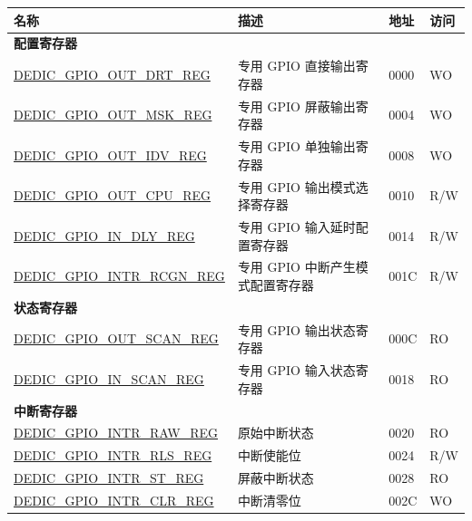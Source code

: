 \begin{longtable}{ | p{6cm} | p{7.2cm} | p{1.3cm} | p{1cm} | }
\hline\rowcolor{lightgray}
名称 & 描述 &  地址 & 访问 \\ \hline
\endhead
\multicolumn{4}{|l|}{\textbf{配置寄存器}} \\ \hline
\hyperref[regdesc:DEDICGPIOOUTDRTREG]{DEDIC\_GPIO\_OUT\_DRT\_REG} & 专用 GPIO 直接输出寄存器 & \hexprefix{}0000 & WO \\ \hline
\hyperref[regdesc:DEDICGPIOOUTMSKREG]{DEDIC\_GPIO\_OUT\_MSK\_REG} & 专用 GPIO 屏蔽输出寄存器 & \hexprefix{}0004 & WO \\ \hline
\hyperref[regdesc:DEDICGPIOOUTIDVREG]{DEDIC\_GPIO\_OUT\_IDV\_REG} & 专用 GPIO 单独输出寄存器 & \hexprefix{}0008 & WO \\ \hline
\hyperref[regdesc:DEDICGPIOOUTCPUREG]{DEDIC\_GPIO\_OUT\_CPU\_REG} & 专用 GPIO 输出模式选择寄存器 & \hexprefix{}0010 & R/W \\ \hline
\hyperref[regdesc:DEDICGPIOINDLYREG]{DEDIC\_GPIO\_IN\_DLY\_REG} & 专用 GPIO 输入延时配置寄存器 & \hexprefix{}0014 & R/W \\ \hline
\hyperref[regdesc:DEDICGPIOINTRRCGNREG]{DEDIC\_GPIO\_INTR\_RCGN\_REG} & 专用 GPIO 中断产生模式配置寄存器 & \hexprefix{}001C & R/W \\ \hline
\multicolumn{4}{|l|}{\textbf{状态寄存器}} \\ \hline
\hyperref[regdesc:DEDICGPIOOUTSCANREG]{DEDIC\_GPIO\_OUT\_SCAN\_REG} & 专用 GPIO 输出状态寄存器 & \hexprefix{}000C & RO \\ \hline
\hyperref[regdesc:DEDICGPIOINSCANREG]{DEDIC\_GPIO\_IN\_SCAN\_REG} & 专用 GPIO 输入状态寄存器 & \hexprefix{}0018 & RO \\ \hline
\multicolumn{4}{|l|}{\textbf{中断寄存器}} \\ \hline
\hyperref[regdesc:DEDICGPIOINTRRAWREG]{DEDIC\_GPIO\_INTR\_RAW\_REG} & 原始中断状态 & \hexprefix{}0020 & RO \\ \hline
\hyperref[regdesc:DEDICGPIOINTRRLSREG]{DEDIC\_GPIO\_INTR\_RLS\_REG} & 中断使能位 & \hexprefix{}0024 & R/W \\ \hline
\hyperref[regdesc:DEDICGPIOINTRSTREG]{DEDIC\_GPIO\_INTR\_ST\_REG} & 屏蔽中断状态 & \hexprefix{}0028 & RO \\ \hline
\hyperref[regdesc:DEDICGPIOINTRCLRREG]{DEDIC\_GPIO\_INTR\_CLR\_REG} & 中断清零位 & \hexprefix{}002C & WO \\ \hline
\end{longtable}

